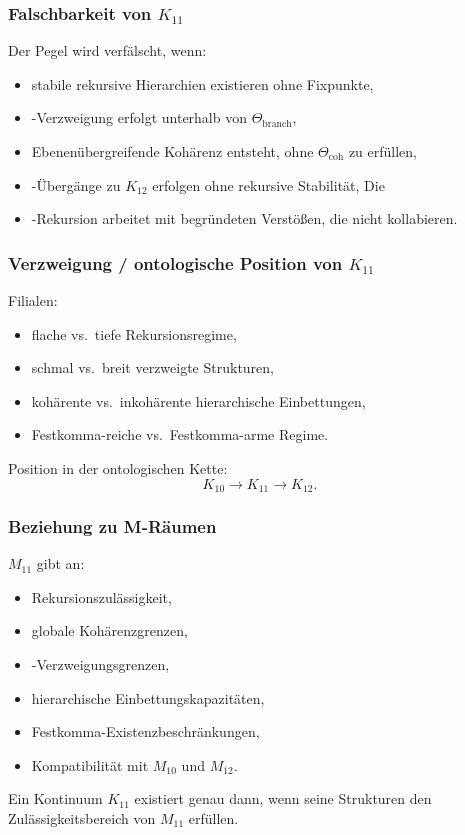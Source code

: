 \subsubsection{Falschbarkeit von $K_{11}$}

Der Pegel wird verfälscht, wenn:
\begin{itemize}
    \item stabile rekursive Hierarchien existieren ohne Fixpunkte,
    \item-Verzweigung erfolgt unterhalb von $\Theta_{\mathrm{branch}}$,
    \item Ebenenübergreifende Kohärenz entsteht, ohne $\Theta_{\mathrm{coh}}$ zu erfüllen,
    \item-Übergänge zu $K_{12}$ erfolgen ohne rekursive Stabilität,
    Die \item-Rekursion arbeitet mit begründeten Verstößen, die nicht kollabieren.
\end{itemize}

\subsubsection{Verzweigung / ontologische Position von $K_{11}$}

Filialen:
\begin{itemize}
    \item flache vs.\ tiefe Rekursionsregime,
    \item schmal vs.\ breit verzweigte Strukturen,
    \item kohärente vs.\ inkohärente hierarchische Einbettungen,
    \item Festkomma-reiche vs.\ Festkomma-arme Regime.
\end{itemize}

Position in der ontologischen Kette:
\[
K_{10} \to K_{11} \to K_{12}.
\]

\subsubsection{Beziehung zu M-Räumen}

$M_{11}$ gibt an:
\begin{itemize}
    \item Rekursionszulässigkeit,
    \item globale Kohärenzgrenzen,
    \item-Verzweigungsgrenzen,
    \item hierarchische Einbettungskapazitäten,
    \item Festkomma-Existenzbeschränkungen,
    \item Kompatibilität mit $M_{10}$ und $M_{12}$.
\end{itemize}

Ein Kontinuum $K_{11}$ existiert genau dann, wenn seine Strukturen den Zulässigkeitsbereich von $M_{11}$ erfüllen.
